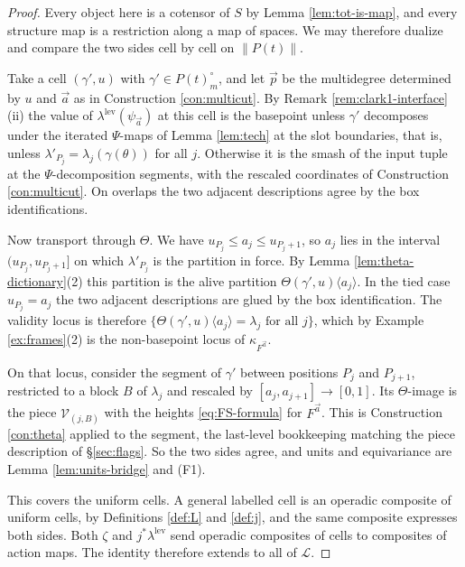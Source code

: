 \documentclass[12pt]{amsart}
\theoremstyle{definition}
\theoremstyle{remark}
\newcommand{\Cal}[1]{\mathcal{#1}}
\newcommand{\Lop}{\mathcal{L}}                   %
\newcommand{\Thet}{\Theta}                       %
\newcommand{\fat}[1]{\lVert #1 \rVert}           %
\newcommand{\alive}[2]{#1\langle #2\rangle}      %
\begin{document}
\begin{proof}
Every object here is a cotensor of $S$ by Lemma \ref{lem:tot-is-map}, and every structure map is a restriction along a map of spaces. We may therefore dualize and compare the two sides cell by cell on $\fat{P(t)}$.

Take a cell $(\gamma', u)$ with $\gamma'\in P(t)^{\circ}_m$, and let $\vec p$ be the multidegree determined by $u$ and $\vec a$ as in Construction \ref{con:multicut}. By Remark \ref{rem:clark1-interface}(ii) the value of $\lambda^{\mathrm{lev}}(\psi_{\vec a})$ at this cell is the basepoint unless $\gamma'$ decomposes under the iterated $\Psi$-maps of Lemma \ref{lem:tech} at the slot boundaries, that is, unless $\lambda'_{P_j} = \lambda_j(\gamma(\theta))$ for all $j$. Otherwise it is the smash of the input tuple at the $\Psi$-decomposition segments, with the rescaled coordinates of Construction \ref{con:multicut}. On overlaps the two adjacent descriptions agree by the box identifications.

Now transport through $\Thet$. We have $u_{P_j}\leq a_j\leq u_{P_j+1}$, so $a_j$ lies in the interval $(u_{P_j}, u_{P_j+1}]$ on which $\lambda'_{P_j}$ is the partition in force. By Lemma \ref{lem:theta-dictionary}(2) this partition is the alive partition $\alive{\Thet(\gamma',u)}{a_j}$. In the tied case $u_{P_j}=a_j$ the two adjacent descriptions are glued by the box identification. The validity locus is therefore $\{\alive{\Thet(\gamma',u)}{a_j} = \lambda_j \text{ for all } j\}$, which by Example \ref{ex:frames}(2) is the non-basepoint locus of $\kappa_{F^{\vec a}}$.

On that locus, consider the segment of $\gamma'$ between positions $P_j$ and $P_{j+1}$, restricted to a block $B$ of $\lambda_j$ and rescaled by $[a_j,a_{j+1}]\to[0,1]$. Its $\Thet$-image is the piece $\Cal{V}_{(j,B)}$ with the heights \eqref{eq:FS-formula} for $F^{\vec a}$. This is Construction \ref{con:theta} applied to the segment, the last-level bookkeeping matching the piece description of \S\ref{sec:flags}. So the two sides agree, and units and equivariance are Lemma \ref{lem:units-bridge} and (F1).

This covers the uniform cells. A general labelled cell is an operadic composite of uniform cells, by Definitions \ref{def:L} and \ref{def:j}, and the same composite expresses both sides. Both $\zeta$ and $j^{*}\lambda^{\mathrm{lev}}$ send operadic composites of cells to composites of action maps. The identity therefore extends to all of $\Lop$.
\end{proof}
\end{document}
